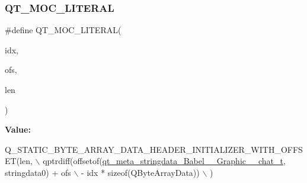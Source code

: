 \subsubsection{\texorpdfstring{Q\+T\+\_\+\+M\+O\+C\+\_\+\+L\+I\+T\+E\+R\+AL}{QT\_MOC\_LITERAL}}
{\footnotesize\ttfamily \#define Q\+T\+\_\+\+M\+O\+C\+\_\+\+L\+I\+T\+E\+R\+AL(\begin{DoxyParamCaption}\item[{}]{idx,  }\item[{}]{ofs,  }\item[{}]{len }\end{DoxyParamCaption})}

{\bfseries Value\+:}
\begin{DoxyCode}
Q\_STATIC\_BYTE\_ARRAY\_DATA\_HEADER\_INITIALIZER\_WITH\_OFFSET(len, \(\backslash\)
    qptrdiff(offsetof(\hyperlink{structqt__meta__stringdata__Babel____Graphic____chat__t}{qt\_meta\_stringdata\_Babel\_\_Graphic\_\_chat\_t}, 
      stringdata0) + ofs \(\backslash\)
        - idx * \textcolor{keyword}{sizeof}(QByteArrayData)) \(\backslash\)
    )
\end{DoxyCode}
